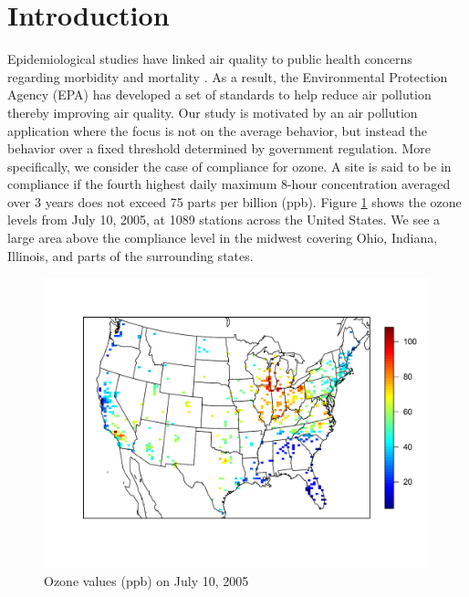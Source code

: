 \documentclass[useAMS,usenatbib,referee]{biom}
\begin{document}
\section{Introduction}\label{s:intro}
Epidemiological studies have linked air quality to public health concerns regarding morbidity and mortality \citep{Samet2000}.
As a result, the Environmental Protection Agency (EPA) has developed a set of standards to help reduce air pollution thereby improving air quality.
Our study is motivated by an air pollution application where the focus is not on the average behavior, but instead the behavior over a fixed threshold determined by government regulation.
More specifically, we consider the case of compliance for ozone.
A site is said to be in compliance if the fourth highest daily maximum 8-hour concentration averaged over 3 years does not exceed 75 parts per billion (ppb).
Figure \ref{fig:ozone-10jul} shows the ozone levels from July 10, 2005, at 1089 stations across the United States.
We see a large area above the compliance level in the midwest covering Ohio, Indiana, Illinois, and parts of the surrounding states.

\begin{figure}[h!tbp]
  \centering
  \includegraphics[width=0.75\linewidth]{plots/ozone-10jul-us.pdf}
  \caption{Ozone values (ppb) on July 10, 2005}
  \label{fig:ozone-10jul}
\end{figure}
\end{document}
